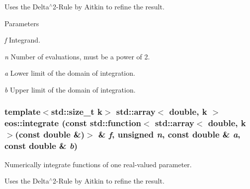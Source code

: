 Uses the Delta$^\wedge$2-\/Rule by Aitkin to refine the result.


\begin{DoxyParams}{Parameters}
\item[{\em f}]Integrand. \item[{\em n}]Number of evaluations, must be a power of 2. \item[{\em a}]Lower limit of the domain of integration. \item[{\em b}]Upper limit of the domain of integration. \end{DoxyParams}
\hypertarget{namespaceeos_aa97e022b32760a5d657bc35b9151efb8}{
\subsubsection[{integrate}]{\setlength{\rightskip}{0pt plus 5cm}template$<$std::size\_\-t k$>$ std::array$<$ double, k $>$ eos::integrate (const std::function$<$ std::array$<$ double, k $>$(const double \&)$>$ \& {\em f}, \/  unsigned {\em n}, \/  const double \& {\em a}, \/  const double \& {\em b})}}
\label{namespaceeos_aa97e022b32760a5d657bc35b9151efb8}
Numerically integrate functions of one real-\/valued parameter.

Uses the Delta$^\wedge$2-\/Rule by Aitkin to refine the result.


